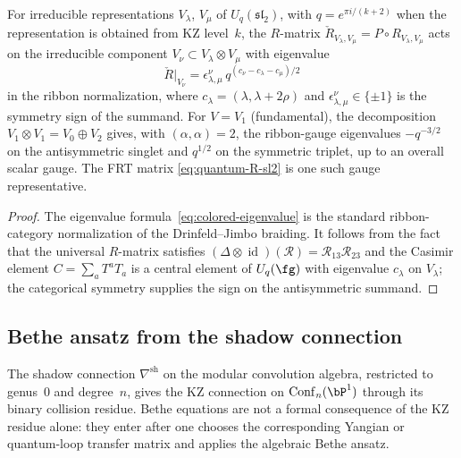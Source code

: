 \begin{proposition}
\label{prop:colored-rmatrix}
For irreducible representations $V_\lambda$, $V_\mu$ of
$U_q(\mathfrak{sl}_2)$, with \(q=e^{\pi i/(k+2)}\) when the
representation is obtained from KZ level~\(k\), the $R$-matrix
$\check R_{V_\lambda, V_\mu}=P\circ R_{V_\lambda,V_\mu}$ acts on the
irreducible component
$V_\nu \subset V_\lambda \otimes V_\mu$ with eigenvalue
\begin{equation}\label{eq:colored-eigenvalue}
\check R\big|_{V_\nu}
= \epsilon_{\lambda,\mu}^{\nu}\,
q^{(c_\nu-c_\lambda-c_\mu)/2}
\end{equation}
in the ribbon normalization, where
\(c_\lambda=(\lambda,\lambda+2\rho)\) and
\(\epsilon_{\lambda,\mu}^{\nu}\in\{\pm1\}\) is the symmetry sign of
the summand.
For $V = V_1$ \textup{(}fundamental\textup{)}, the decomposition
$V_1 \otimes V_1 = V_0 \oplus V_2$ gives, with
\((\alpha,\alpha)=2\), the ribbon-gauge eigenvalues
\(-q^{-3/2}\) on the antisymmetric singlet and \(q^{1/2}\) on the
symmetric triplet, up to an overall scalar gauge. The FRT matrix
\eqref{eq:quantum-R-sl2} is one such gauge representative.
\end{proposition}

\begin{proof}
The eigenvalue formula~\eqref{eq:colored-eigenvalue} is the standard
ribbon-category normalization of the Drinfeld--Jimbo braiding. It
follows from the fact that the universal $R$-matrix satisfies
$(\Delta \otimes \operatorname{id})(\mathcal{R})
= \mathcal{R}_{13}\mathcal{R}_{23}$
and the Casimir element $C = \sum_a T^a T_a$ is a central element
of $U_q(\fg)$ with eigenvalue \(c_\lambda\) on $V_\lambda$; the
categorical symmetry supplies the sign on the antisymmetric summand.
\end{proof}


\subsection{Bethe ansatz from the shadow connection}
\label{subsec:bethe-ansatz-shadow}

The shadow connection $\nabla^{\mathrm{sh}}$ on the modular
convolution algebra, restricted to genus~$0$ and degree~$n$, gives the
KZ connection on $\operatorname{Conf}_n(\bP^1)$ through its binary
collision residue. Bethe equations are not a formal consequence of the
KZ residue alone: they enter after one chooses the corresponding
Yangian or quantum-loop transfer matrix and applies the algebraic
Bethe ansatz.


